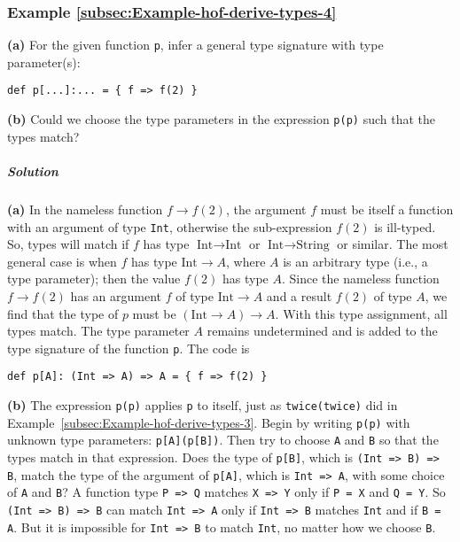 \subsubsection{Example \label{subsec:Example-hof-derive-types-4}\ref{subsec:Example-hof-derive-types-4}}

\textbf{(a)} For the given function \lstinline!p!, infer a general
type signature with type parameter(s):
\begin{lstlisting}
def p[...]:... = { f => f(2) }
\end{lstlisting}
\textbf{(b)} Could we choose the type parameters in the expression
\lstinline!p(p)! such that the types match?

\subparagraph{Solution}

\textbf{(a)} In the nameless function $f\rightarrow f(2)$, the argument
$f$ must be itself a function with an argument of type \lstinline!Int!,
otherwise the sub-expression $f(2)$ is ill-typed. So, types will
match if $f$ has type $\text{Int}\rightarrow\text{Int}$ or $\text{Int}\rightarrow\text{String}$
or similar. The most general case is when $f$ has type $\text{Int}\rightarrow A$,
where $A$ is an arbitrary type (i.e., a type parameter); then the
value $f(2)$ has type $A$. Since the nameless function $f\rightarrow f(2)$
has an argument $f$ of type $\text{Int}\rightarrow A$ and a result
$f(2)$ of type $A$, we find that the type of $p$ must be $\left(\text{Int}\rightarrow A\right)\rightarrow A$.
With this type assignment, all types match. The type parameter $A$
remains undetermined and is added to the type signature of the function
\lstinline!p!. The code is
\begin{lstlisting}
def p[A]: (Int => A) => A = { f => f(2) }
\end{lstlisting}

\textbf{(b)} The expression \lstinline!p(p)! applies \lstinline!p!
to itself, just as \lstinline!twice(twice)! did in Example~\ref{subsec:Example-hof-derive-types-3}.
Begin by writing \lstinline!p(p)! with unknown type parameters: \lstinline!p[A](p[B])!.
Then  try to choose \lstinline!A! and \lstinline!B! so that the
types match in that expression. Does the type of \lstinline!p[B]!,
which is \lstinline!(Int => B) => B!, match the type of the argument
of \lstinline!p[A]!, which is \lstinline!Int => A!, with some choice
of \lstinline!A! and \lstinline!B!? A function type \lstinline!P => Q!
matches \lstinline!X => Y! only if \lstinline!P = X! and \lstinline!Q = Y!.
So \lstinline!(Int => B) => B! can match \lstinline!Int => A! only
if \lstinline!Int => B! matches \lstinline!Int! and if \lstinline!B = A!.
But it is impossible for \lstinline!Int => B! to match \lstinline!Int!,
no matter how we choose \lstinline!B!. 

